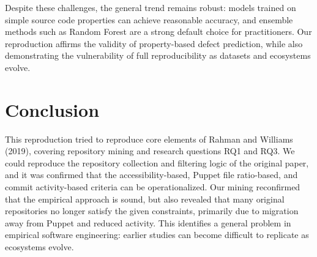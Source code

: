 \documentclass[conference]{IEEEtran}
\begin{document}
Despite these challenges, the general trend remains robust: models trained on simple source code properties can achieve reasonable accuracy, and ensemble methods such as Random Forest are a strong default choice for practitioners.
Our reproduction affirms the validity of property-based defect prediction, while also demonstrating the vulnerability of full reproducibility as datasets and ecosystems evolve.

	
	\section{Conclusion}
This reproduction tried to reproduce core elements of Rahman and Williams (2019), covering repository mining and research questions RQ1 and RQ3.
We could reproduce the repository collection and filtering logic of the original paper, and it was confirmed that the accessibility-based, Puppet file ratio-based, and commit activity-based criteria can be operationalized.
Our mining reconfirmed that the empirical approach is sound, but also revealed that many original repositories no longer satisfy the given constraints, primarily due to migration away from Puppet and reduced activity.
This identifies a general problem in empirical software engineering: earlier studies can become difficult to replicate as ecosystems evolve.
\end{document}
